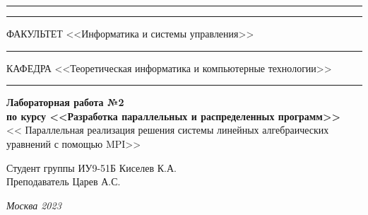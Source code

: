 \documentclass[a4paper, 14pt]{extarticle}
\begin{document}
\begin{titlepage}
\vspace{-25pt}
\hspace{-35pt}\rule{\textwidth}{2.3pt}

\vspace*{-20.3pt}
\hspace{-35pt}\rule{\textwidth}{0.4pt}

\vspace{1.5ex}
\hspace{-35pt} \noindent \small ФАКУЛЬТЕТ\hspace{80pt} <<Информатика и системы управления>>

\vspace*{-16pt}
\hspace{47pt}\rule{0.83\textwidth}{0.4pt}

\vspace{0.5ex}
\hspace{-35pt} \noindent \small КАФЕДРА\hspace{50pt} <<Теоретическая информатика и компьютерные технологии>>

\vspace*{-16pt}
\hspace{30pt}\rule{0.866\textwidth}{0.4pt}
  
\vspace{11em}

\begin{center}
\Large {\bf Лабораторная работа №2 } \\ 
\large {\bf по курсу <<Разработка параллельных и распределенных программ>>} \\

\large << Параллельная реализация решения системы линейных алгебраических
уравнений с помощью MPI>> \\
\end{center}\normalsize

\vspace{8em}


\begin{flushright}
  {Студент группы ИУ9-51Б Киселев К.А. \hspace*{15pt}\\ 
  \vspace{2ex}
  Преподаватель Царев А.С.\hspace*{15pt}}
\end{flushright}

\bigskip

\vfill
 

\begin{center}
\textsl{Москва 2023}
\end{center}
\end{titlepage}
\end{document}
